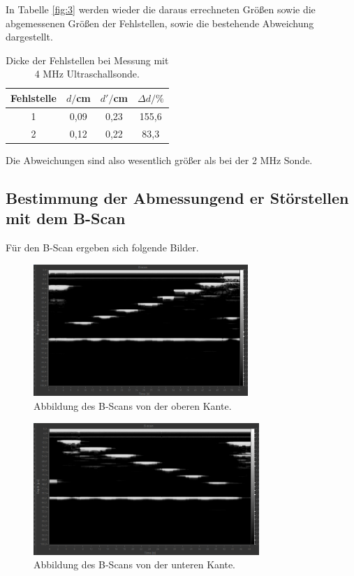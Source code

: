 In Tabelle \ref{fig:3} werden wieder die daraus errechneten Größen sowie die abgemessenen Größen der Fehlstellen,
sowie die bestehende Abweichung dargestellt.

\begin{table}[H]
  \centering
  \caption{Dicke der Fehlstellen bei Messung mit 4 MHz Ultraschallsonde.}
  \label{tab:3}
  \begin{tabular}{c c c c}
    \toprule
  Fehlstelle & $d/$cm & $d'/$cm & $\Delta d/ \%$  \\
    \midrule
    1  &  0,09 & 0,23 & 155,6    \\
    2  &  0,12 & 0,22 & 83,3  \\
    \bottomrule
  \end{tabular}
\end{table}

Die Abweichungen sind also wesentlich größer als bei der 2 MHz Sonde. 

\subsection{Bestimmung der Abmessungend er Störstellen mit dem B-Scan}

Für den B-Scan ergeben sich folgende Bilder.

\begin{figure}[H]
  \centering
  \includegraphics[height=5cm]{BScanoben.PNG}
  \caption{Abbildung des B-Scans von der oberen Kante.}
  \label{fig:acryl}
\end{figure}

\begin{figure}[H]
  \centering
  \includegraphics[height=5cm]{B-Scanunten.PNG}
  \caption{Abbildung des B-Scans von der unteren Kante.}
  \label{fig:acryl}
\end{figure}


